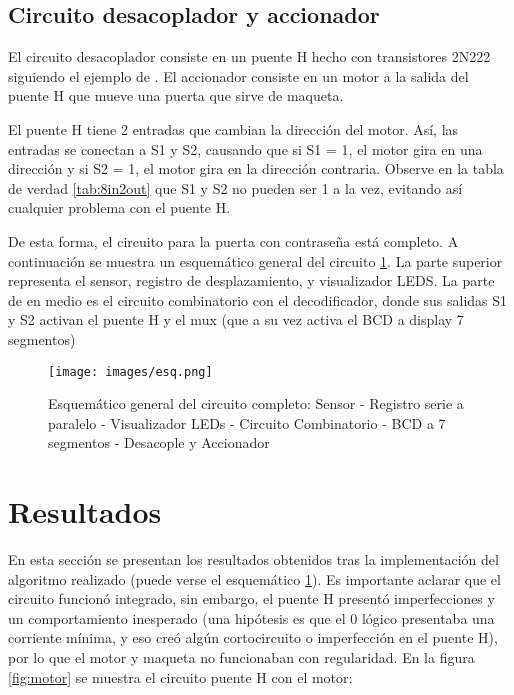 \documentclass[conference]{IEEEtran}  %
\begin{document}
\subsection{Circuito desacoplador y accionador}

El circuito desacoplador consiste en un puente H hecho con transistores 2N222 siguiendo el ejemplo de \cite{makordoba2025circuitoH}. El accionador consiste en un motor a la salida del puente H que mueve una puerta que sirve de maqueta. 

El puente H tiene 2 entradas que cambian la dirección del motor. Así, las entradas se conectan a S1 y S2, causando que si S1 = 1, el motor gira en una dirección y si S2 = 1, el motor gira en la dirección contraria. Observe en la tabla de verdad \ref{tab:8in2out} que S1 y S2 no pueden ser 1 a la vez, evitando así cualquier problema con el puente H.

De esta forma, el circuito para la puerta con contraseña está completo. A continuación se muestra un esquemático general del circuito \ref{fig:esq}. La parte superior representa el sensor, registro de desplazamiento, y visualizador LEDS. La parte de en medio es el circuito combinatorio con el decodificador, donde sus salidas S1 y S2 activan el puente H y el mux (que a su vez activa el BCD a display 7 segmentos)

\begin{figure}[h!] %
    \centering    
    \texttt{[image: images/esq.png]} %
    \caption{Esquemático general del circuito completo: Sensor - Registro serie a paralelo - Visualizador LEDs - Circuito Combinatorio - BCD a 7 segmentos - Desacople y Accionador}
    \label{fig:esq}
\end{figure}

\section{Resultados}

En esta sección se presentan los resultados obtenidos tras la implementación del algoritmo realizado (puede verse el esquemático \ref{fig:esq}). Es importante aclarar que el circuito funcionó integrado, sin embargo, el puente H presentó imperfecciones y un comportamiento inesperado (una hipótesis es que el 0 lógico presentaba una corriente mínima, y eso creó algún cortocircuito o imperfección en el puente H), por lo que el motor y maqueta no funcionaban con regularidad. En la figura \ref{fig:motor} se muestra el circuito puente H con el motor:
\end{document}
